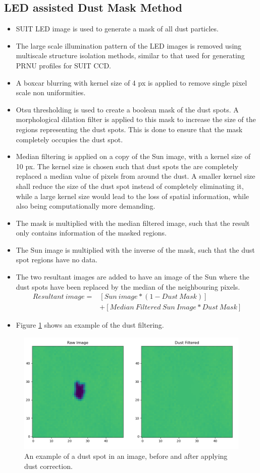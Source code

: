 \documentclass[11pt,a4paper]{article}
\begin{document}
	\subsection{LED assisted Dust Mask Method}
	\begin{itemize}
		\item SUIT LED image is used to generate a mask of all dust particles.
		\item The large scale illumination pattern of the LED images is removed using multiscale structure isolation methods, similar to that used for generating PRNU profiles for SUIT CCD.
		\item A boxcar blurring with kernel size of 4 px is applied to remove single pixel scale non uniformities.
		\item Otsu thresholding is used to create a boolean mask of the dust spots. A morphological dilation filter is applied to this mask to increase the size of the regions representing the dust spots. This is done to ensure that the mask completely occupies the dust spot.
		\item Median filtering is applied on a copy of the Sun image, with a kernel size of 10 px. The kernel size is chosen such that dust spots the are completely replaced a median value of pixels from around the dust. A smaller kernel size shall reduce the size of the dust spot instead of completely eliminating it, while a large kernel size would lead to the loss of spatial information, while also being computationally more demanding.
		\item The mask is multiplied with the median filtered image, such that the result only contains information of the masked regions.
		\item The Sun image is multiplied with the inverse of the mask, such that the dust spot regions have no data.
		\item The two resultant images are added to have an image of the Sun where the dust spots have been replaced by the median of the neighbouring pixels.
		\begin{align*}
			Resultant~image = &[Sun~image * (1-Dust~Mask) ]\\
			&+ [Median~Filtered~Sun~Image * Dust~Mask]
		\end{align*}
		\item Figure \ref{fig:dustexample} shows an example of the dust filtering.
	\end{itemize}
	
		\begin{figure}
		\centering
		\includegraphics[width=0.7\linewidth]{pics/screenshot_2024-06-28_22-51-28.png}
		\caption{An example of a dust spot in an image, before and after applying dust correction.}
		\label{fig:dustexample}
	\end{figure}
	
\end{document}
